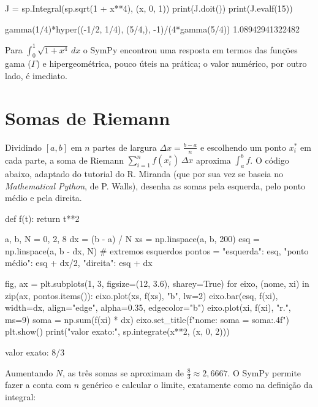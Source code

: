 \begin{entrada}
J = sp.Integral(sp.sqrt(1 + x**4), (x, 0, 1))
print(J.doit())
print(J.evalf(15))
\end{entrada}
\begin{saida}
gamma(1/4)*hyper((-1/2, 1/4), (5/4,), -1)/(4*gamma(5/4))
1.08942941322482
\end{saida}

Para $\int_0^1\sqrt{1+x^4}\,dx$ o SymPy encontrou uma resposta em termos das funções gama ($\Gamma$) e
hipergeométrica, pouco úteis na prática; o valor numérico, por outro lado, é imediato.

\section{Somas de Riemann}

Dividindo $[a,b]$ em $n$ partes de largura $\Delta x=\frac{b-a}{n}$ e escolhendo um ponto $x_i^*$ em cada parte, a
soma de Riemann $\sum_{i=1}^n f(x_i^*)\,\Delta x$ aproxima $\int_a^b f$. O código abaixo, adaptado do tutorial do
R. Miranda (que por sua vez se baseia no \emph{Mathematical Python}, de P. Walls), desenha as somas pela esquerda,
pelo ponto médio e pela direita.

\begin{entrada}
def f(t):
    return t**2

a, b, N = 0, 2, 8
dx = (b - a) / N
xs = np.linspace(a, b, 200)
esq = np.linspace(a, b - dx, N)          # extremos esquerdos
pontos = {"esquerda": esq, "ponto médio": esq + dx/2, "direita": esq + dx}

fig, ax = plt.subplots(1, 3, figsize=(12, 3.6), sharey=True)
for eixo, (nome, xi) in zip(ax, pontos.items()):
    eixo.plot(xs, f(xs), "b", lw=2)
    eixo.bar(esq, f(xi), width=dx, align="edge", alpha=0.35, edgecolor="b")
    eixo.plot(xi, f(xi), "r.", ms=9)
    soma = np.sum(f(xi) * dx)
    eixo.set_title(f"{nome}: soma = {soma:.4f}")
plt.show()
print("valor exato:", sp.integrate(x**2, (x, 0, 2)))
\end{entrada}
\begin{saida}
valor exato: 8/3
\end{saida}

Aumentando $N$, as três somas se aproximam de $\frac83\approx2{,}6667$. O SymPy permite fazer a conta com $n$
genérico e calcular o limite, exatamente como na definição da integral:

